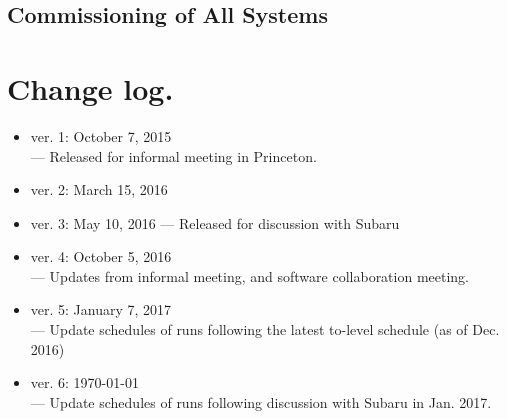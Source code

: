 \documentclass[11pt]{article}
\begin{document}
\renewcommand{\thesubsubsection}{A-\;\arabic{subsubsection}}
\subsection{Commissioning of All Systems}\label{sec:All}


%






\clearpage



\clearpage

\appendix



\section*{Change log.}
\begin{itemize}
\item ver. 1: October 7, 2015 \\
--- Released for informal meeting in Princeton.
\item ver. 2:  March 15, 2016
\item ver. 3: May 10, 2016
--- Released for discussion with Subaru
\item ver. 4: October 5, 2016 \\
--- Updates from informal meeting, and software collaboration meeting.
\item ver. 5: January 7, 2017 \\
--- Update schedules of runs following the latest to-level schedule (as of Dec. 2016)
\item ver. 6: \today \\
--- Update schedules of runs following discussion with Subaru in Jan. 2017.
\end{itemize}
\end{document}
